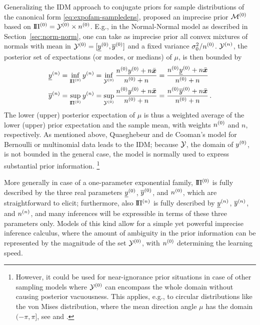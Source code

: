 Generalizing the IDM approach to conjugate priors for sample distributions of the canonical form \eqref{eq:expofam-sampledens},
\textcite{2005:quaeghebeurcooman} proposed an imprecise prior $\mathcal{M}^{(0)}$ based on $\text{I}\!\Pi^{(0)} = \mathcal{Y}^{(0)} \times n^{(0)}$.
E.g., in the Normal-Normal model as described in Section~\ref{sec:norm-norm},
one can take as imprecise prior all convex mixtures of normals with mean in $\mathcal{Y}^{(0)} = [\underline{y}^{(0)}, \overline{y}^{(0)}]$ and a fixed variance $\sigma_0^2/n^{(0)}$.
$\mathcal{Y}^{(n)}$, the posterior set of expectations (or modes, or medians) of $\mu$, is then bounded by
\begin{align}
\label{eq:qdc-ynl}
\underline{y}^{(n)} &= \inf_{\text{I}\!\Pi^{(0)}} y^{(n)} = \inf_{\mathcal{Y}^{(0)}} \frac{n^{(0)}y^{(0)} + n\bar{{\bm x}}}{n^{(0)} + n} = \frac{n^{(0)}\underline{y}^{(0)} + n\bar{{\bm x}}}{n^{(0)} + n}\\
\label{eq:qdc-ynu}
\overline{y}^{(n)} &= \sup_{\text{I}\!\Pi^{(0)}} y^{(n)} = \sup_{\mathcal{Y}^{(0)}} \frac{n^{(0)}y^{(0)} + n\bar{{\bm x}}}{n^{(0)} + n} = \frac{n^{(0)}\overline{y}^{(0)} + n\bar{{\bm x}}}{n^{(0)} + n}\,.
\end{align}
The lower (upper) posterior expectation of $\mu$ is thus a weighted average of the lower (upper) prior expectation and the sample mean,
with weights $n^{(0)}$ and $n$, respectively.
As mentioned above, Quaeghebeur and de Cooman's \parencite*{2005:quaeghebeurcooman} model for Bernoulli or multinomial data leads to the IDM;
because $\mathcal{Y}$, the domain of $y^{(0)}$, is not bounded in the general case,
the model is normally used to express substantial prior information.%
\footnote{However, it could be used for near-ignorance prior situations
in case of other sampling models where $\mathcal{Y}^{(0)}$ can encompass the whole domain without causing posterior vacuousness.
This applies, e.g., to circular distributions like the von Mises distribution,
where the mean direction angle $\mu$ has the domain $(-\pi, \pi]$,
see \textcite[\S B.1.4]{2009:quaeghebeur::phd} and \textcite{1976:mardiaelatoum}.}

More generally in case of a one-parameter exponential family,
$\text{I}\!\Pi^{(0)}$ is fully described by the three real parameters $\underline{y}^{(0)}$, $\overline{y}^{(0)}$, and $n^{(0)}$,
which are straightforward to elicit; furthermore, also $\text{I}\!\Pi^{(n)}$ is fully described by $\underline{y}^{(n)}$, $\overline{y}^{(n)}$, and $n^{(n)}$,
and many inferences will be expressible in terms of these three parameters only.
Models of this kind allow for a simple yet powerful imprecise inference calculus,
where the amount of ambiguity in the prior information can be represented by the magnitude of the set $\mathcal{Y}^{(0)}$,
with $n^{(0)}$ determining the learning speed.

